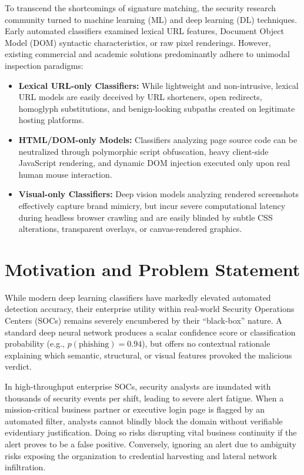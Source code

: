 To transcend the shortcomings of signature matching, the security research community turned to machine learning (ML) and deep learning (DL) techniques. Early automated classifiers examined lexical URL features, Document Object Model (DOM) syntactic characteristics, or raw pixel renderings. However, existing commercial and academic solutions predominantly adhere to unimodal inspection paradigms:
\begin{itemize}
\item \textbf{Lexical URL-only Classifiers:} While lightweight and non-intrusive, lexical URL models are easily deceived by URL shorteners, open redirects, homoglyph substitutions, and benign-looking subpaths created on legitimate hosting platforms.
\item \textbf{HTML/DOM-only Models:} Classifiers analyzing page source code can be neutralized through polymorphic script obfuscation, heavy client-side JavaScript rendering, and dynamic DOM injection executed only upon real human mouse interaction.
\item \textbf{Visual-only Classifiers:} Deep vision models analyzing rendered screenshots effectively capture brand mimicry, but incur severe computational latency during headless browser crawling and are easily blinded by subtle CSS alterations, transparent overlays, or canvas-rendered graphics.
\end{itemize}

\section{Motivation and Problem Statement}
While modern deep learning classifiers have markedly elevated automated detection accuracy, their enterprise utility within real-world Security Operations Centers (SOCs) remains severely encumbered by their ``black-box'' nature. A standard deep neural network produces a scalar confidence score or classification probability (e.g., $p(\text{phishing}) = 0.94$), but offers no contextual rationale explaining which semantic, structural, or visual features provoked the malicious verdict.

In high-throughput enterprise SOCs, security analysts are inundated with thousands of security events per shift, leading to severe alert fatigue. When a mission-critical business partner or executive login page is flagged by an automated filter, analysts cannot blindly block the domain without verifiable evidentiary justification. Doing so risks disrupting vital business continuity if the alert proves to be a false positive. Conversely, ignoring an alert due to ambiguity risks exposing the organization to credential harvesting and lateral network infiltration.

